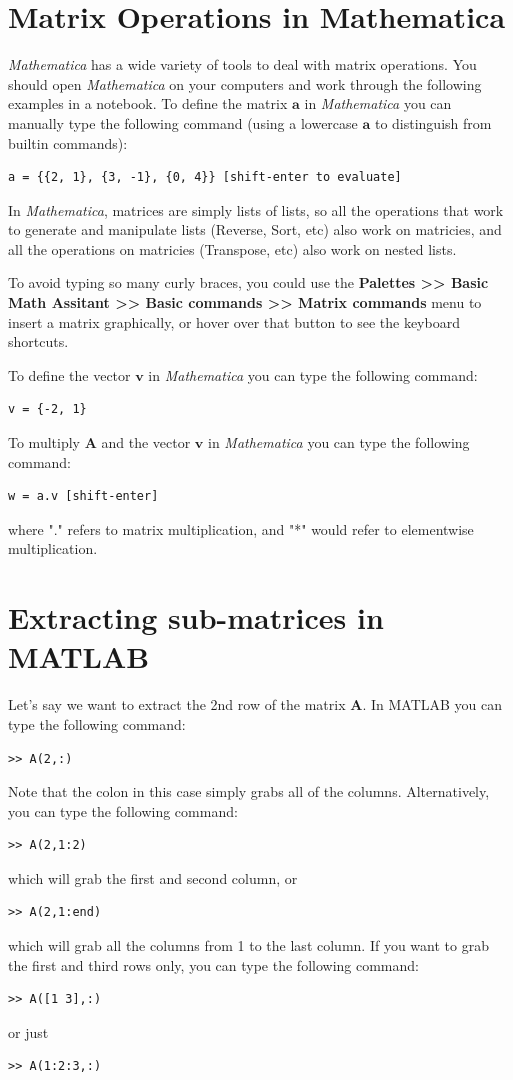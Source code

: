 \documentclass{tufte-handout}
\begin{document}
\section{Matrix Operations in Mathematica}
\textit{Mathematica} has a wide variety of tools to deal with matrix operations. You should open \textit{Mathematica} on your computers and work through the following examples in a notebook. To define the matrix $\mathbf{a}$ in \textit{Mathematica} you can manually type the following command (using a lowercase $\mathbf{a}$ to distinguish from builtin commands):
\begin{verbatim}
a = {{2, 1}, {3, -1}, {0, 4}} [shift-enter to evaluate]
\end{verbatim}
In \textit{Mathematica}, matrices are simply lists of lists, so all the operations that work to generate and manipulate lists (Reverse, Sort, etc) also work on matricies, and all the operations on matricies (Transpose, etc) also work on nested lists.

To avoid typing so many curly braces, you could use the \textbf{Palettes >> Basic Math Assitant >> Basic commands >> Matrix commands} menu to insert a matrix graphically, or hover over that button to see the keyboard shortcuts.


To define the vector $\mathbf{v}$ in \textit{Mathematica} you can type the following command:
\begin{verbatim}
v = {-2, 1}
\end{verbatim}

To multiply $\mathbf{A}$ and the vector $\mathbf{v}$ in \textit{Mathematica} you can type the following command:
\begin{verbatim}
w = a.v [shift-enter]
\end{verbatim}
where "." refers to matrix multiplication, and "*" would refer to elementwise multiplication.

\section{Extracting sub-matrices in MATLAB}
Let's say we want to extract the 2nd row of the matrix $\mathbf{A}$. In MATLAB you can type the following command:
\begin{verbatim}
>> A(2,:)
\end{verbatim}
Note that the colon in this case simply grabs all of the columns. Alternatively, you can type the following command:
\begin{verbatim}
>> A(2,1:2)
\end{verbatim}
which will grab the first and second column, or
\begin{verbatim}
>> A(2,1:end)
\end{verbatim}
which will grab all the columns from 1 to the last column. If you want to grab the first and third rows only, you can type the following command:
\begin{verbatim}
>> A([1 3],:)
\end{verbatim}
or just
\begin{verbatim}
>> A(1:2:3,:)
\end{verbatim}
\end{document}
